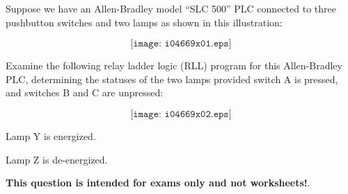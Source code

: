 

Suppose we have an Allen-Bradley model ``SLC 500'' PLC connected to three pushbutton switches and two lamps as shown in this illustration:

$$\texttt{[image: i04669x01.eps]}$$

Examine the following relay ladder logic (RLL) program for this Allen-Bradley PLC, determining the statuses of the two lamps provided switch A is pressed, and switches B and C are unpressed:

$$\texttt{[image: i04669x02.eps]}$$







Lamp Y is energized.

\vskip 10pt

Lamp Z is de-energized.







{\bf This question is intended for exams only and not worksheets!}.



